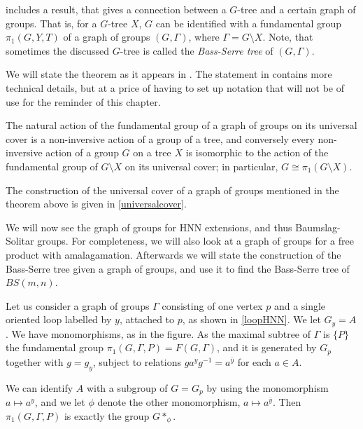 \cite[section I.5.4]{Ser80} includes a result, that gives a connection between a $G$-tree and a certain graph of groups. That is, for a $G$-tree $X$, $G$ can be identified with a fundamental group $\pi_1(G,Y,T)$ of a graph of groups $(G,\Gamma)$, where $\Gamma = G\setminus X$.  Note, that sometimes the discussed $G$-tree is called the \emph{Bass-Serre tree} of $(G,\Gamma)$.

We will state the theorem as it appears in \cite[Corollary 7.45]{Ba}. The statement in \cite[Section I.5.4, Theorem 13]{Ser80} contains more technical details, but at a price of having to set up notation that will not be of use for the reminder of this chapter.

\begin{theorem}\label{structuretheorem}
   The natural action of the fundamental group of a graph of groups on its universal cover is a non-inversive action of a group of a tree, and conversely every non-inversive action of a group $G$ on a tree $X$ is isomorphic to the action of the fundamental group of $G\setminus X$ on its universal cover; in particular, $G \cong \pi_1( G\setminus X)$.
\end{theorem}

\begin{remark}
    The construction of the universal cover of a graph of groups mentioned in the theorem above is given in \ref{universalcover}.
\end{remark}

We will now see the graph of groups for HNN extensions, and thus Baumslag-Solitar groups. For completeness, we will also look at a graph of groups for a free product with amalagamation. Afterwards we will state the construction of the Bass-Serre tree given a graph of groups, and use it to find the Bass-Serre tree of $BS(m,n)$.


\begin{example}\cite[section I.5.1]{Ser80}\label{HNN graph}
    Let us consider a graph of groups $\Gamma$ consisting of one vertex $p$ and a single oriented loop labelled by $y$, attached to $p$,  as shown in \ref{loopHNN}. We let $G_y = A$. We have monomorphisms, as in the figure. As the maximal subtree of $\Gamma$ is $\{P\}$ the fundamental group $\pi_1(G,\Gamma,P) = F(G,\Gamma)$, and it is generated by $G_p$ together with $g = g_y$, subject to relations $ga^yg^{-1} = a^{\overline{y}}$ for each $a \in A$.

    We can identify $A$ with a subgroup of $G = G_p$ by using the monomorphism $a \mapsto a^y$, and we let $\phi$ denote the other monomorphism, $a \mapsto a^{\overline{y}}$. Then $\pi_1(G,\Gamma,P)$ is exactly the group $G \ast _\phi$.
\end{example}

